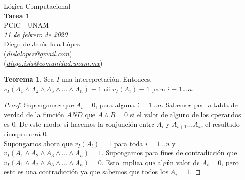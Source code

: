 \documentclass[letterpaper,12pt]{memoir}
\theoremstyle{definition}
\newtheorem*{thm}{Teorema}
\begin{document}
\begin{center}
  {\large Lógica Computacional}\\
  \vspace{0.2cm}
  {\large\bfseries Tarea 1}\\
  \vspace{0.2cm}
  {\large PCIC - UNAM}\\
  \vspace{0.5cm}
  {\itshape 11 de febrero de 2020}\\
  \vspace{0.5cm}
  Diego de Jesús Isla López\\
  (\href{mailto:dislalopez@gmail.com}{\itshape dislalopez@gmail.com})\\
  (\href{mailto:diego.isla@comunidad.unam.mx}{\itshape diego.isla@comunidad.unam.mx})\\
\end{center}

\begin{thm}
    Sea $I$ una interepretación. Entonces, $v_I(A_1 \wedge A_2 \wedge A_3 \wedge ... \wedge A_n) = 1$ sii $v_I(A_i) = 1$ para $i = 1 ... n$.
\end{thm}

\begin{proof}
    Supongamos que $A_i = 0$, para alguna $i = 1 ... n$. Sabemos por la tabla de verdad de la función $AND$ que $A \wedge B = 0$ si el valor de alguno de los operandos es $0$. De este modo, si hacemos la conjunción entre $A_i$ y $A_{i+1} ... A_n$, el resultado siempre será $0$.\\

    Supongamos ahora que $v_I(A_i) = 1$ para toda $i = 1 ... n$ y $v_I(A_1 \wedge A_2 \wedge A_3 \wedge ... \wedge A_n) = 1$. Supongamos para fines de contradicción que $v_I(A_1 \wedge A_2 \wedge A_3 \wedge ... \wedge A_n) = 0$. Esto implica que algún valor de $A_i = 0$, pero esto es una contradicción ya que sabemos que todos los $A_i = 1$.
\end{proof}
\end{document}
